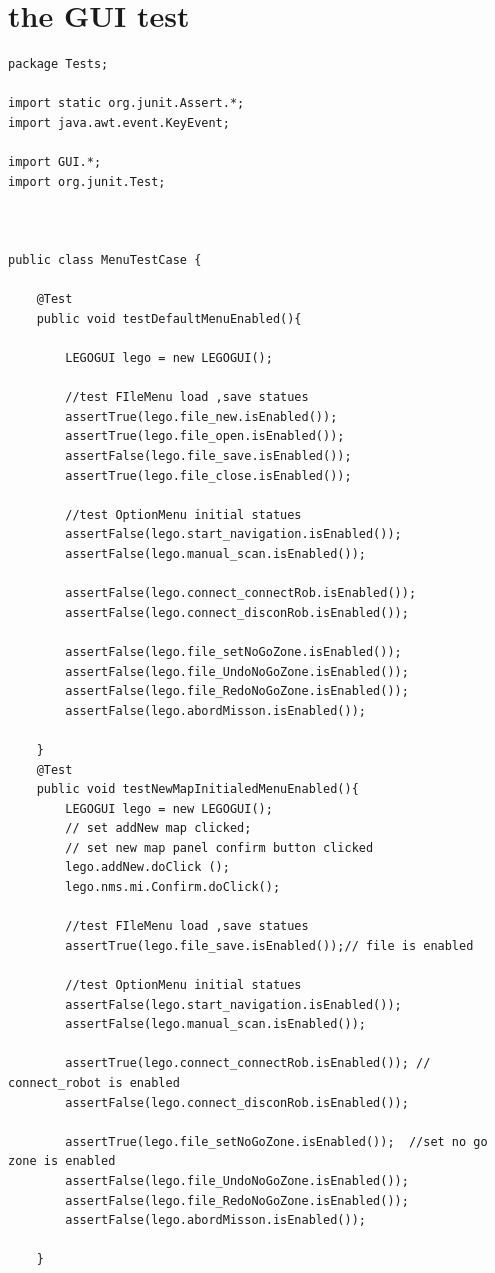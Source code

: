 \documentclass[11pt, a4paper]{report}
\begin{document}
\chapter{the GUI test}
\begin{lstlisting}
package Tests;

import static org.junit.Assert.*;
import java.awt.event.KeyEvent;

import GUI.*;
import org.junit.Test;



public class MenuTestCase {

	@Test
	public void testDefaultMenuEnabled(){
		
		LEGOGUI lego = new LEGOGUI();
		
		//test FIleMenu load ,save statues
		assertTrue(lego.file_new.isEnabled());
		assertTrue(lego.file_open.isEnabled());
		assertFalse(lego.file_save.isEnabled());
		assertTrue(lego.file_close.isEnabled());
		
		//test OptionMenu initial statues
		assertFalse(lego.start_navigation.isEnabled());
		assertFalse(lego.manual_scan.isEnabled());
		
		assertFalse(lego.connect_connectRob.isEnabled());
		assertFalse(lego.connect_disconRob.isEnabled());
		
		assertFalse(lego.file_setNoGoZone.isEnabled());
		assertFalse(lego.file_UndoNoGoZone.isEnabled());
		assertFalse(lego.file_RedoNoGoZone.isEnabled());
		assertFalse(lego.abordMisson.isEnabled());
			
	}
	@Test
	public void testNewMapInitialedMenuEnabled(){
		LEGOGUI lego = new LEGOGUI();
		// set addNew map clicked;
		// set new map panel confirm button clicked
		lego.addNew.doClick ();
		lego.nms.mi.Confirm.doClick();
		
		//test FIleMenu load ,save statues
		assertTrue(lego.file_save.isEnabled());// file is enabled
				
		//test OptionMenu initial statues
		assertFalse(lego.start_navigation.isEnabled());
		assertFalse(lego.manual_scan.isEnabled());
				
		assertTrue(lego.connect_connectRob.isEnabled()); // connect_robot is enabled
		assertFalse(lego.connect_disconRob.isEnabled());
				
		assertTrue(lego.file_setNoGoZone.isEnabled());  //set no go zone is enabled
		assertFalse(lego.file_UndoNoGoZone.isEnabled());
		assertFalse(lego.file_RedoNoGoZone.isEnabled());
		assertFalse(lego.abordMisson.isEnabled());
		
	}
	

\end{lstlisting}
\end{document}
